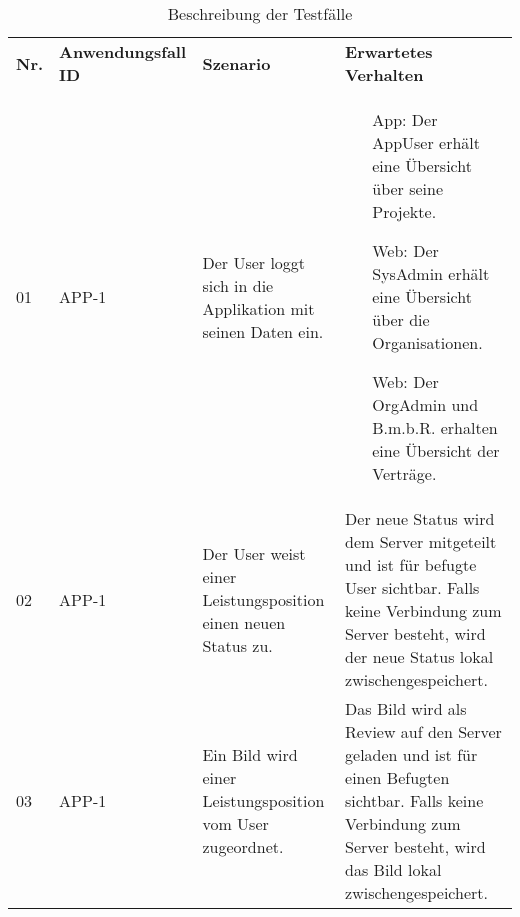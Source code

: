 \centering
\begin{longtable}[c]{|p{1cm}|p{3cm}|p{4cm}|p{6cm}|}
    \caption{Beschreibung der Testfälle}
    \label{fig:testfälle}
    \endlastfoot
    \hline \multicolumn{4}{|r|}{{Weitergeführt auf der folgenden Seite}}                                                                                                                                                                                                                                                                        \\ \hline
    \endfoot
    \hline
    \textbf{Nr.} & \textbf{Anwendungsfall ID} & \textbf{Szenario}                                                                                                  & \textbf{Erwartetes Verhalten}                                                                                                                                              \\ \hline
    \endhead
    \hline
    01           & APP-1                      & Der User loggt sich in die Applikation mit seinen Daten ein.                                                       &
    \begin{itemize}
        \item[App:] Der AppUser erhält eine Übersicht über seine Projekte.
        \item[Web:] Der SysAdmin erhält eine Übersicht über die Organisationen.
        \item[Web:] Der OrgAdmin und B.m.b.R. erhalten eine Übersicht der Verträge.
    \end{itemize}                                                                                                                                                                                                                                                                                                                   \\ \hline
    02           & APP-1                      & Der User weist einer Leistungsposition einen neuen Status zu.                                                    & Der neue Status wird dem Server mitgeteilt und ist für befugte User sichtbar. Falls keine Verbindung zum Server besteht, wird der neue Status lokal zwischengespeichert. \\ \hline
    03           & APP-1                      & Ein Bild wird einer Leistungsposition vom User zugeordnet.                                                       & Das Bild wird als Review auf den Server geladen und ist für einen Befugten sichtbar. Falls keine Verbindung zum Server besteht, wird das Bild lokal zwischengespeichert.   \\ \hline

\end{longtable}
